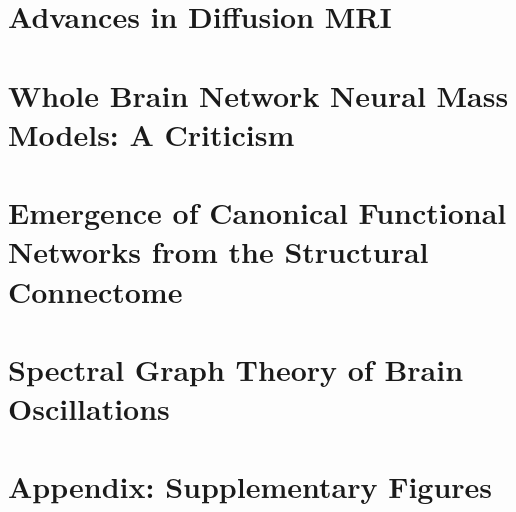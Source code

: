 \documentclass[phd,tocprelim]{cornell}
\begin{document}
\chapter{Advances in Diffusion MRI}
\label{chap:dwi}


\chapter{Whole Brain Network Neural Mass Models: A Criticism}
\label{chap:nmm}


\chapter{Emergence of Canonical Functional Networks from the Structural Connectome}
\label{chap:lap}


\chapter{Spectral Graph Theory of Brain Oscillations}
\label{chap:sgm}


\appendix
\chapter{Appendix: Supplementary Figures}



\end{document}
